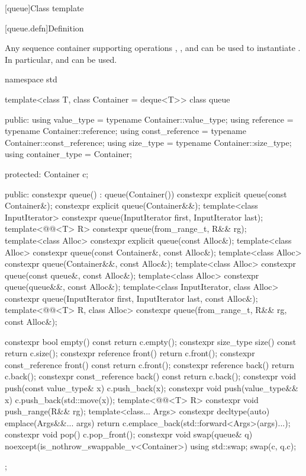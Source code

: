 [queue]{Class template }

[queue.defn]{Definition}

\pnum
{}%
Any sequence container supporting operations
,
,
and
can be used to instantiate
.
In particular,
and
can be used.

\begin{codeblock}
namespace std {
  template<class T, class Container = deque<T>>
  class queue {
  public:
    using value_type      = typename Container::value_type;
    using reference       = typename Container::reference;
    using const_reference = typename Container::const_reference;
    using size_type       = typename Container::size_type;
    using container_type  =          Container;

  protected:
    Container c;

  public:
    constexpr queue() : queue(Container()) {}
    constexpr explicit queue(const Container&);
    constexpr explicit queue(Container&&);
    template<class InputIterator> constexpr queue(InputIterator first, InputIterator last);
    template<@@<T> R> constexpr queue(from_range_t, R&& rg);
    template<class Alloc> constexpr explicit queue(const Alloc&);
    template<class Alloc> constexpr queue(const Container&, const Alloc&);
    template<class Alloc> constexpr queue(Container&&, const Alloc&);
    template<class Alloc> constexpr queue(const queue&, const Alloc&);
    template<class Alloc> constexpr queue(queue&&, const Alloc&);
    template<class InputIterator, class Alloc>
      constexpr queue(InputIterator first, InputIterator last, const Alloc&);
    template<@@<T> R, class Alloc>
      constexpr queue(from_range_t, R&& rg, const Alloc&);

    constexpr bool              empty() const     { return c.empty(); }
    constexpr size_type         size()  const     { return c.size(); }
    constexpr reference         front()           { return c.front(); }
    constexpr const_reference   front() const     { return c.front(); }
    constexpr reference         back()            { return c.back(); }
    constexpr const_reference   back() const      { return c.back(); }
    constexpr void push(const value_type& x)      { c.push_back(x); }
    constexpr void push(value_type&& x)           { c.push_back(std::move(x)); }
    template<@@<T> R> constexpr void push_range(R&& rg);
    template<class... Args>
      constexpr decltype(auto) emplace(Args&&... args)
        { return c.emplace_back(std::forward<Args>(args)...); }
    constexpr void pop()                          { c.pop_front(); }
    constexpr void swap(queue& q) noexcept(is_nothrow_swappable_v<Container>)
      { using std::swap; swap(c, q.c); }
  };

}
\end{codeblock}
